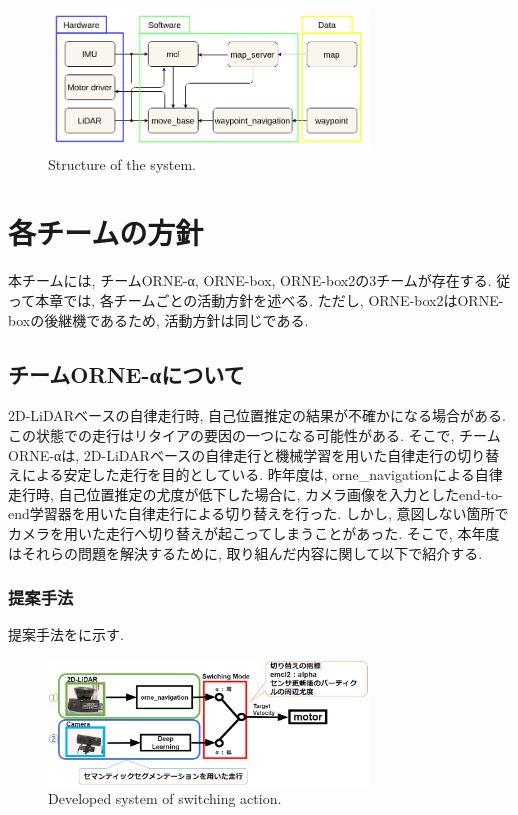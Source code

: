\documentclass[uplatex, twocolumn, 9pt]{jsproceedings}
\begin{document}
\begin{figure}[h]
  \centering
  \includegraphics[width=85mm]{fig/software.pdf}
  \caption{Structure of the system.}
  \label{fig:soft-fig}%
\end{figure}

\section{各チームの方針}
本チームには, チームORNE-α, ORNE-box, ORNE-box2の3チームが存在する. 従って本章では, 各チームごとの活動方針を述べる. ただし, ORNE-box2はORNE-boxの後継機であるため, 活動方針は同じである.

\subsection{チームORNE-αについて}
2D-LiDARベースの自律走行時, 自己位置推定の結果が不確かになる場合がある. この状態での走行はリタイアの要因の一つになる可能性がある. そこで, チームORNE-αは, 2D-LiDARベースの自律走行と機械学習を用いた自律走行の切り替えによる安定した走行を目的としている. 昨年度は, orne\_navigationによる自律走行時, 自己位置推定の尤度が低下した場合に, カメラ画像を入力としたend-to-end学習器を用いた自律走行による切り替えを行った. しかし, 意図しない箇所でカメラを用いた走行へ切り替えが起こってしまうことがあった. そこで, 本年度はそれらの問題を解決するために, 取り組んだ内容に関して以下で紹介する. 

\subsubsection{提案手法}
提案手法をに示す. 

\begin{figure}[h]
  \centering
  \includegraphics[width=85mm]{fig/kirikae.pdf}
  \caption{Developed system of switching action.}
  \label{fig:kirikae}%
\end{figure}
\end{document}
